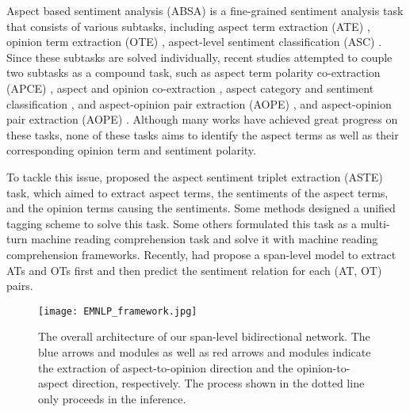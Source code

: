 \documentclass[11pt]{article}
\begin{document}
Aspect based sentiment analysis (ABSA) is a fine-grained sentiment analysis task that consists of various subtasks, including aspect term extraction (ATE) \cite{DBLP:conf/emnlp/WangPDX16, DBLP:conf/emnlp/LiL17, DBLP:conf/acl/XuLSY18, DBLP:conf/ijcai/LiBLLY18, DBLP:conf/acl/MaLWXW19}, opinion term extraction (OTE) \cite{DBLP:journals/kbs/PoriaCG16, DBLP:conf/naacl/FanWDHC19,DBLP:journals/corr/abs-2010-04640}, aspect-level sentiment classification (ASC) \cite{DBLP:conf/acl/DongWTTZX14, DBLP:conf/emnlp/TangQL16, DBLP:conf/acl/HeLND18, DBLP:conf/aaai/LiW0Z019}. Since these subtasks are solved individually, recent studies attempted to couple two subtasks as a compound task, such as aspect term polarity co-extraction (APCE) \cite{DBLP:conf/aaai/LiL17, DBLP:conf/acl/HeLND19,  DBLP:conf/aaai/LiBLL19}, aspect and opinion co-extraction \cite{DBLP:journals/coling/QiuLBC11, DBLP:conf/ijcai/LiuXLZ13, DBLP:journals/taslp/YuJX19}, aspect category and sentiment classification \cite{DBLP:conf/emnlp/HuZZCSCS19}, and aspect-opinion pair extraction (AOPE) \cite{DBLP:conf/acl/ChenLWZC20, DBLP:conf/acl/ZhaoHZLX20, DBLP:conf/aaai/GaoWLWZL21}, and aspect-opinion pair extraction (AOPE) \cite{DBLP:conf/aaai/GaoWLWZL21, DBLP:conf/acl/ZhaoHZLX20, DBLP:conf/ijcai/Wu0RJL21}. Although many works have achieved great progress on these tasks, none of these tasks aims to identify the aspect terms as well as their corresponding opinion term and sentiment polarity.

To tackle this issue, \cite{DBLP:conf/aaai/PengXBHLS20} proposed the aspect sentiment triplet extraction (ASTE) task, which aimed to extract aspect terms, the sentiments of the aspect terms, and the opinion terms causing the sentiments. Some methods \cite{DBLP:conf/emnlp/XuLLB20,DBLP:journals/corr/abs-2010-04640} designed a unified tagging scheme to solve this task. Some others \cite{chen2021bidirectional, DBLP:conf/aaai/MaoSYC21} formulated this task as a multi-turn machine reading comprehension task and solve it with machine reading comprehension frameworks. Recently, \cite{DBLP:conf/acl/XuCB20} had propose a span-level model to extract ATs and OTs first and then predict the sentiment relation for each (AT, OT) pairs.


\begin{figure*} [t]
	\centering
	\texttt{[image: EMNLP\_framework.jpg]}
	\caption{The overall architecture of our span-level bidirectional network. The blue arrows and modules as well as red arrows and modules indicate the extraction of aspect-to-opinion direction and the opinion-to-aspect direction, respectively. The process shown in the dotted line only proceeds in the inference.}
	\label{framework}
\end{figure*}
\end{document}
